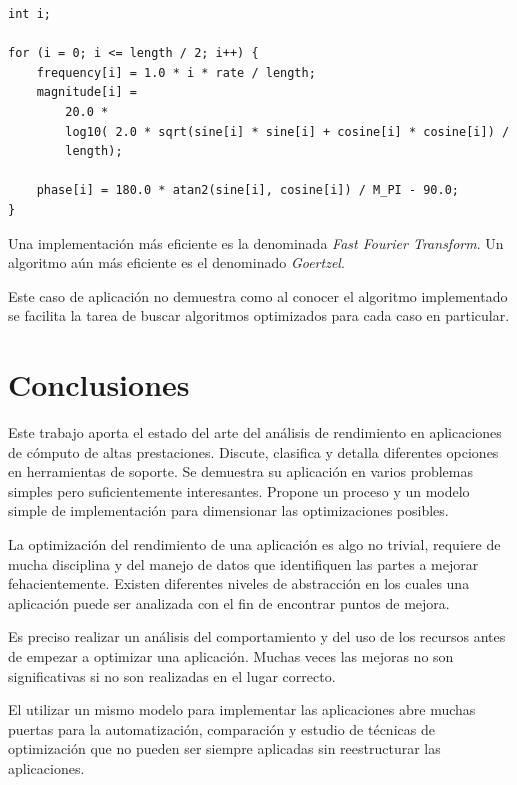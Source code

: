 \documentclass[a4paper]{report}
\begin{document}
\begin{verbatim}
int i;

for (i = 0; i <= length / 2; i++) {
    frequency[i] = 1.0 * i * rate / length;
    magnitude[i] =
        20.0 *
        log10( 2.0 * sqrt(sine[i] * sine[i] + cosine[i] * cosine[i]) /
        length);

    phase[i] = 180.0 * atan2(sine[i], cosine[i]) / M_PI - 90.0;
}
\end{verbatim}

Una implementaci\'on m\'as eficiente es la denominada {\it Fast Fourier Transform}.
Un algoritmo a\'un m\'as eficiente es el denominado {\it Goertzel}.

\bigskip

Este caso de aplicaci\'on no demuestra como al conocer el algoritmo implementado se
facilita la tarea de buscar algoritmos optimizados para cada caso en particular.

\chapter{Conclusiones}

Este trabajo aporta el estado del arte del an\'alisis de rendimiento en
aplicaciones de c\'omputo de altas prestaciones. Discute, clasifica y detalla
diferentes opciones en herramientas de soporte. Se demuestra su aplicaci\'on
en varios problemas simples pero suficientemente interesantes. Propone un
proceso y un modelo simple de implementaci\'on para dimensionar las
optimizaciones posibles.

\bigskip

La optimizaci\'on del rendimiento de una aplicaci\'on es algo no trivial, requiere de mucha
disciplina y del manejo de datos que identifiquen las partes a mejorar fehacientemente.
Existen diferentes niveles de abstracci\'on en los cuales una aplicaci\'on puede ser analizada con el fin
de encontrar puntos de mejora. 

\bigskip

Es preciso realizar un an\'alisis del comportamiento y del uso de los recursos antes de
empezar a optimizar una aplicaci\'on. Muchas veces las mejoras no son significativas si no
son realizadas en el lugar correcto.

\bigskip

El utilizar un mismo modelo para implementar las aplicaciones abre muchas puertas para
la automatizaci\'on, comparaci\'on y estudio de t\'ecnicas de optimizaci\'on que no pueden
ser siempre aplicadas sin reestructurar las aplicaciones.
\end{document}
